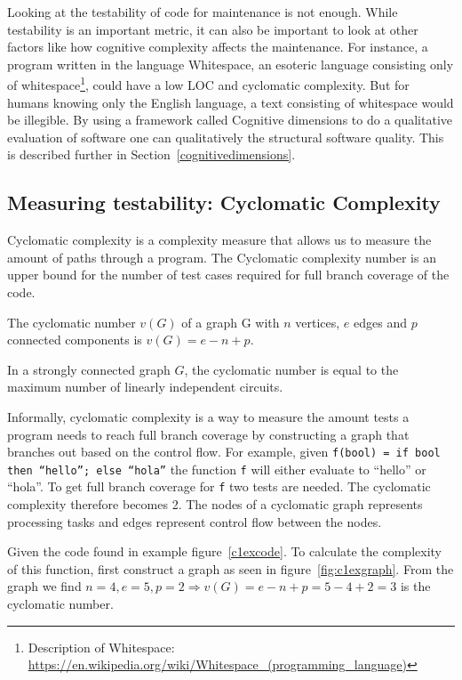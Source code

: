 Looking at the testability of code for maintenance is not enough. While
testability is an important metric, it can also be important to look at other
factors like how cognitive complexity affects the maintenance. For instance, a
program written in the language Whitespace, an esoteric language consisting only
of whitespace\footnote{Description of Whitespace:
\url{https://en.wikipedia.org/wiki/Whitespace_(programming_language)}}, could
have a low LOC and cyclomatic complexity. But for humans knowing only the
English language, a text consisting of whitespace would be illegible. By using a
framework called Cognitive dimensions to do a qualitative evaluation of
software one can qualitatively the structural software quality. This is described
further in Section~\ref{cognitivedimensions}.


\subsection{Measuring testability: Cyclomatic Complexity}\label{cyclomaticcomplexity}

Cyclomatic complexity is a complexity measure that allows us to measure the
amount of paths through a program. The Cyclomatic complexity number is an upper
bound for the number of test cases required for full branch coverage of the
code. 

\theoremstyle{definition}
\begin{definition}
The cyclomatic number $v(G)$ of a graph G with $n$ vertices, $e$ edges and $p$
connected components is $v(G) = e - n + p$.
\end{definition}

\begin{theorem}
In a strongly connected graph $G$, the cyclomatic number is equal to the
maximum number of linearly independent circuits.~\cite{McCabe}
\end{theorem}

Informally, cyclomatic complexity is a way to measure the amount tests a program
needs to reach full branch coverage by constructing a graph that branches out
based on the control flow. For example, given \texttt{f(bool) = if bool then
``hello''; else ``hola''} the function \texttt{f} will either evaluate to
``hello'' or ``hola''. To get full branch coverage for \texttt{f} two tests are
needed. The cyclomatic complexity therefore becomes 2. The nodes of a cyclomatic
graph represents processing tasks and edges represent control flow between
the nodes. 

Given the code found in example figure~\ref{c1excode}. To calculate the
complexity of this function, first construct a graph as seen in
figure~\ref{fig:c1exgraph}. From the graph we find $n=4, e=5, p=2\Rightarrow
v(G)=e-n+p=5-4+2=3$ is the cyclomatic number.

